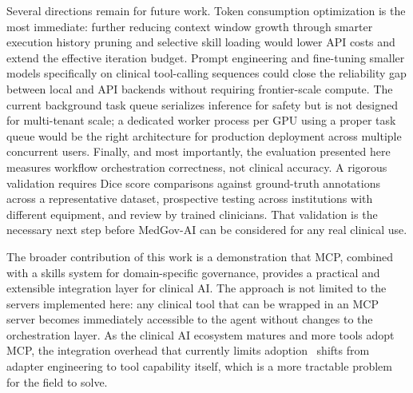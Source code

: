 \documentclass[conference]{IEEEtran}
\begin{document}
Several directions remain for future work. Token consumption optimization is the most immediate: further reducing context window growth through smarter execution history pruning and selective skill loading would lower API costs and extend the effective iteration budget. Prompt engineering and fine-tuning smaller models specifically on clinical tool-calling sequences could close the reliability gap between local and API backends without requiring frontier-scale compute. The current background task queue serializes inference for safety but is not designed for multi-tenant scale; a dedicated worker process per GPU using a proper task queue would be the right architecture for production deployment across multiple concurrent users. Finally, and most importantly, the evaluation presented here measures workflow orchestration correctness, not clinical accuracy. A rigorous validation requires Dice score comparisons against ground-truth annotations across a representative dataset, prospective testing across institutions with different equipment, and review by trained clinicians. That validation is the necessary next step before MedGov-AI can be considered for any real clinical use.

The broader contribution of this work is a demonstration that MCP, combined with a skills system for domain-specific governance, provides a practical and extensible integration layer for clinical AI. The approach is not limited to the servers implemented here: any clinical tool that can be wrapped in an MCP server becomes immediately accessible to the agent without changes to the orchestration layer. As the clinical AI ecosystem matures and more tools adopt MCP, the integration overhead that currently limits adoption~\cite{collaco2026scoping} shifts from adapter engineering to tool capability itself, which is a more tractable problem for the field to solve.



\end{document}
